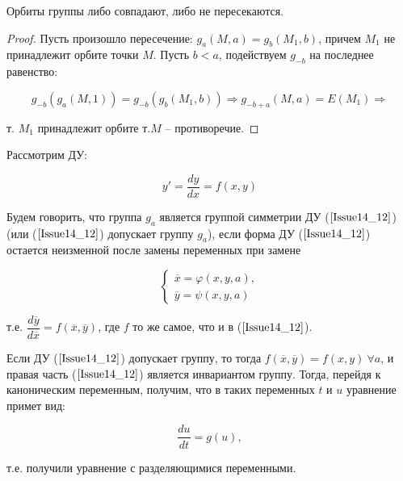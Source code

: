 \begin{theorem}

Орбиты группы либо совпадают, либо не пересекаются.

\begin{proof}

Пусть произошло пересечение: $g_a(M,a) = g_b(M_1,b)$, причем $M_1$ не принадлежит орбите точки $M$. Пусть $b < a$, подействуем $g_{-b}$ на последнее равенство:

\[ g_{-b}(g_a(M,1)) = g_{-b}(g_b(M_1, b)) \Rightarrow g_{-b+a}(M,a) = E(M_1) \Rightarrow\]

т. $M_1$ принадлежит орбите т.$M$ -- противоречие.

\end{proof}

\end{theorem}


Рассмотрим ДУ: 

\begin{equation}
 	y' = \dfrac{dy}{dx} = f(x,y)
 	\label{Issue14_12}
\end{equation}

Будем говорить, что группа $g_a$ является $\textbf{группой симметрии}$ ДУ ($\ref{Issue14_12}$) (или ($\ref{Issue14_12}$) допускает группу $g_a$), если форма ДУ ($\ref{Issue14_12}$) остается неизменной после замены переменных при замене 

\begin{equation}
	\begin{cases}
	\overline{x} = \varphi(x,y,a), \\
	\overline{y} = \psi(x,y,a)
	\end{cases}
\end{equation}

т.е. $\dfrac{d\overline{y}}{d\overline{x}} = f(\overline{x}, \overline{y})$, где $f$ то же самое, что и в ($\ref{Issue14_12}$).

Если ДУ ($\ref{Issue14_12}$) допускает группу, то тогда $f(\overline{x}, \overline{y}) = f(x,y)\ \forall a$, и правая часть ($\ref{Issue14_12}$) является инвариантом группу. Тогда, перейдя к каноническим переменным, получим, что в таких переменных $t$ и $u$ уравнение примет вид:

\begin{equation}
	\dfrac{du}{dt} = g(u),
	\label{Issue14_13}
\end{equation}

т.е. получили уравнение с разделяющимися переменными.




 
